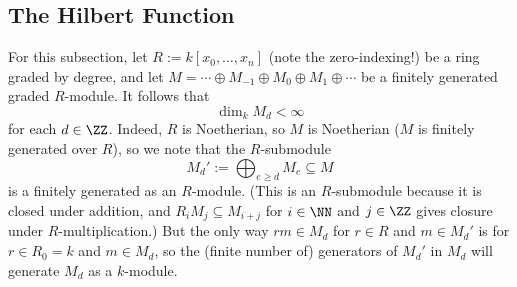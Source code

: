 \documentclass[../notes.tex]{subfiles}
\begin{document}
\subsection{The Hilbert Function}
For this subsection, let $R:=k[x_0,\ldots,x_n]$ (note the zero-indexing!) be a ring graded by degree, and let $M=\cdots\oplus M_{-1}\oplus M_0\oplus M_1\oplus\cdots$ be a finitely generated graded $R$-module. It follows that
\[\dim_kM_d<\infty\]
for each $d\in\ZZ$. Indeed, $R$ is Noetherian, so $M$ is Noetherian ($M$ is finitely generated over $R$), so we note that the $R$-submodule
\[M_d':=\bigoplus_{e\ge d}M_e\subseteq M\]
is a finitely generated as an $R$-module. (This is an $R$-submodule because it is closed under addition, and $R_iM_j\subseteq M_{i+j}$ for $i\in\NN$ and $j\in\ZZ$ gives closure under $R$-multiplication.) But the only way $rm\in M_d$ for $r\in R$ and $m\in M_d'$ is for $r\in R_0=k$ and $m\in M_d$, so the (finite number of) generators of $M_d'$ in $M_d$ will generate $M_d$ as a $k$-module.
\end{document}
